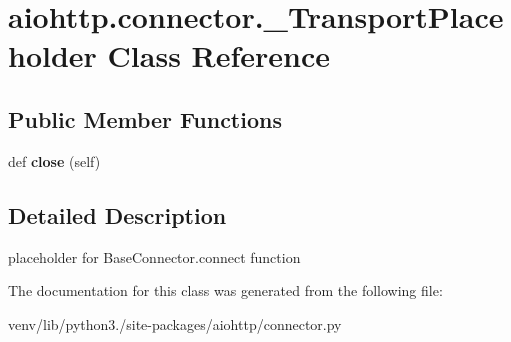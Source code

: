 \hypertarget{classaiohttp_1_1connector_1_1___transport_placeholder}{}\section{aiohttp.\+connector.\+\_\+\+Transport\+Placeholder Class Reference}
\label{classaiohttp_1_1connector_1_1___transport_placeholder}
\subsection*{Public Member Functions}
\begin{DoxyCompactItemize}
\item 
\mbox{\label{classaiohttp_1_1connector_1_1___transport_placeholder_a8bc048fcc06604b199f0d2c9d7172cee}} 
def {\bfseries close} (self)
\end{DoxyCompactItemize}


\subsection{Detailed Description}
\begin{DoxyVerb}placeholder for BaseConnector.connect function \end{DoxyVerb}
 

The documentation for this class was generated from the following file\+:\begin{DoxyCompactItemize}
\item 
venv/lib/python3./site-\/packages/aiohttp/connector.\+py\end{DoxyCompactItemize}
